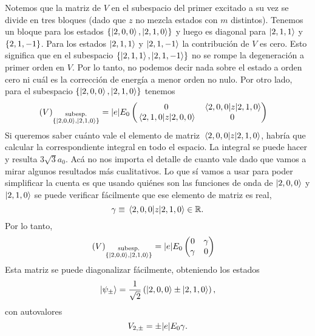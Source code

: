 \documentclass[10pt, a4paper]{article}
\numberwithin{equation}{subsection}
\begin{document}
Notemos que la matriz de $V$ en el subespacio del primer excitado a su vez se
divide en tres bloques (dado que $z$ no mezcla estados con $m$ distintos).
Tenemos un bloque para los estados $\set{\ket{2,0,0},\ket{2,1,0}}$ y luego es
diagonal para $\ket{2,1,1}$ y $\set{2,1,-1}$. Para los estados $\ket{2,1,1}$ y
$\ket{2,1,-1}$ la contribución de $V$ es cero. Esto significa que en el
subespacio $\set{\ket{2,1,1}, \ket{2,1,-1}}$ no se rompe la degeneración a
primer orden en $V$. Por lo tanto, no podemos decir nada sobre el estado a
orden cero ni cuál es la corrección de energía a menor orden no nulo. Por otro
lado, para el subespacio $\set{\ket{2,0,0}, \ket{2,1,0}}$ tenemos
\begin{align}
  (V)_{\substack{\text{subesp.}\\\set{\ket{2,0,0},\ket{2,1,0}}}}
  &= \abs{e}E_0 \begin{pmatrix}
    0 & \matrixel{2,0,0}{z}{2,1,0} \\
    \matrixel{2,1,0}{z}{2,0,0} & 0
  \end{pmatrix}
\end{align}
Si queremos saber cuánto vale el elemento de matriz
$\matrixel{2,0,0}{z}{2,1,0}$, habría que calcular la correspondiente integral
en todo el espacio. La integral se puede hacer y resulta $3\sqrt{3}a_0$. Acá no
nos importa el detalle de cuanto vale dado que vamos a mirar algunos resultados
más cualitativos. Lo que sí vamos a usar para poder simplificar la cuenta es
que usando quiénes son las funciones de onda de $\ket{2,0,0}$ y $\ket{2,1,0}$
se puede verificar fácilmente que ese elemento de matriz es real,
\begin{equation}
  \gamma \eqdef \matrixel{2,0,0}{z}{2,1,0} \in \Reals.
\end{equation}
Por lo tanto,
\begin{align}
  (V)_{\substack{\text{subesp.}\\\set{\ket{2,0,0},\ket{2,1,0}}}}
  &= \abs{e}E_0 \begin{pmatrix}
    0 & \gamma \\
    \gamma & 0
  \end{pmatrix}
\end{align}
Esta matriz se puede diagonalizar fácilmente, obteniendo los estados
\begin{equation}
  \ket{\psi_{\pm}} = \frac{1}{\sqrt{2}}\left(\ket{2,0,0} \pm
    \ket{2,1,0}\right),
\end{equation}
con autovalores
\begin{equation}
  V_{2,\pm} = \pm\abs{e}E_0\gamma.
\end{equation}
\end{document}
